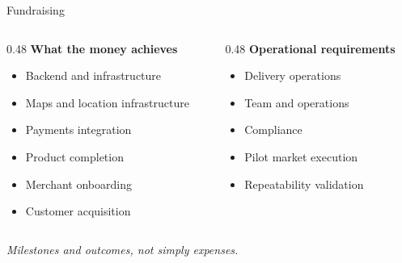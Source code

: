 \documentclass[aspectratio=169]{beamer}
\newcommand{\sectiontitle}[1]{\textbf{\large #1}}
\begin{document}
\begin{frame}{Fundraising}
  \centering
  \vspace{4mm}
  
  
  \vspace{6mm}
  
  
  \vspace{6mm}
  
  \begin{columns}[T]
    \begin{column}{0.48\textwidth}
      \sectiontitle{What the money achieves}
      \vspace{3mm}
      \begin{itemize}
        \item Backend and infrastructure
        \item Maps and location infrastructure
        \item Payments integration
        \item Product completion
        \item Merchant onboarding
        \item Customer acquisition
      \end{itemize}
    \end{column}
    \begin{column}{0.48\textwidth}
      \sectiontitle{Operational requirements}
      \vspace{3mm}
      \begin{itemize}
        \item Delivery operations
        \item Team and operations
        \item Compliance
        \item Pilot market execution
        \item Repeatability validation
      \end{itemize}
    \end{column}
  \end{columns}
  
  \vspace{4mm}
  {\small\itshape Milestones and outcomes, not simply expenses.}
\end{frame}
\end{document}
